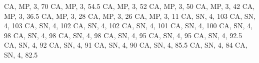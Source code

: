 \documentclass[
]{book}
\newenvironment{Shaded}{\begin{snugshade}}{\end{snugshade}}
\newcommand{\StringTok}[1]{\textcolor[rgb]{0.31,0.60,0.02}{#1}}
\begin{document}
\begin{Shaded}
\begin{Highlighting}[]
\StringTok{ \textquotesingle{}CA\textquotesingle{}, \textquotesingle{}MP\textquotesingle{}, 3, 70}
\StringTok{ \textquotesingle{}CA\textquotesingle{}, \textquotesingle{}MP\textquotesingle{}, 3, 54.5}
\StringTok{ \textquotesingle{}CA\textquotesingle{}, \textquotesingle{}MP\textquotesingle{}, 3, 52}
\StringTok{ \textquotesingle{}CA\textquotesingle{}, \textquotesingle{}MP\textquotesingle{}, 3, 50}
\StringTok{ \textquotesingle{}CA\textquotesingle{}, \textquotesingle{}MP\textquotesingle{}, 3, 42}
\StringTok{ \textquotesingle{}CA\textquotesingle{}, \textquotesingle{}MP\textquotesingle{}, 3, 36.5}
\StringTok{ \textquotesingle{}CA\textquotesingle{}, \textquotesingle{}MP\textquotesingle{}, 3, 28}
\StringTok{ \textquotesingle{}CA\textquotesingle{}, \textquotesingle{}MP\textquotesingle{}, 3, 26}
\StringTok{ \textquotesingle{}CA\textquotesingle{}, \textquotesingle{}MP\textquotesingle{}, 3, 11}
\StringTok{ \textquotesingle{}CA\textquotesingle{}, \textquotesingle{}SN\textquotesingle{}, 4, 103}
\StringTok{ \textquotesingle{}CA\textquotesingle{}, \textquotesingle{}SN\textquotesingle{}, 4, 103}
\StringTok{ \textquotesingle{}CA\textquotesingle{}, \textquotesingle{}SN\textquotesingle{}, 4, 102}
\StringTok{ \textquotesingle{}CA\textquotesingle{}, \textquotesingle{}SN\textquotesingle{}, 4, 102}
\StringTok{ \textquotesingle{}CA\textquotesingle{}, \textquotesingle{}SN\textquotesingle{}, 4, 101}
\StringTok{ \textquotesingle{}CA\textquotesingle{}, \textquotesingle{}SN\textquotesingle{}, 4, 100}
\StringTok{ \textquotesingle{}CA\textquotesingle{}, \textquotesingle{}SN\textquotesingle{}, 4, 98}
\StringTok{ \textquotesingle{}CA\textquotesingle{}, \textquotesingle{}SN\textquotesingle{}, 4, 98}
\StringTok{ \textquotesingle{}CA\textquotesingle{}, \textquotesingle{}SN\textquotesingle{}, 4, 98}
\StringTok{ \textquotesingle{}CA\textquotesingle{}, \textquotesingle{}SN\textquotesingle{}, 4, 95}
\StringTok{ \textquotesingle{}CA\textquotesingle{}, \textquotesingle{}SN\textquotesingle{}, 4, 95}
\StringTok{ \textquotesingle{}CA\textquotesingle{}, \textquotesingle{}SN\textquotesingle{}, 4, 92.5}
\StringTok{ \textquotesingle{}CA\textquotesingle{}, \textquotesingle{}SN\textquotesingle{}, 4, 92}
\StringTok{ \textquotesingle{}CA\textquotesingle{}, \textquotesingle{}SN\textquotesingle{}, 4, 91}
\StringTok{ \textquotesingle{}CA\textquotesingle{}, \textquotesingle{}SN\textquotesingle{}, 4, 90}
\StringTok{ \textquotesingle{}CA\textquotesingle{}, \textquotesingle{}SN\textquotesingle{}, 4, 85.5}
\StringTok{ \textquotesingle{}CA\textquotesingle{}, \textquotesingle{}SN\textquotesingle{}, 4, 84}
\StringTok{ \textquotesingle{}CA\textquotesingle{}, \textquotesingle{}SN\textquotesingle{}, 4, 82.5}

\end{Highlighting}
\end{Shaded}
\end{document}
